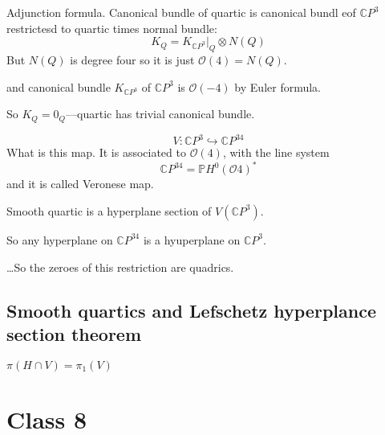 \begin{remark}
	Adjunction formula. Canonical bundle of quartic is canonical bundl eof $\mathbb{C}P^{3}$ restrictesd to quartic times normal bundle:
	\[K_Q=K_{\mathbb{C}P^{3}}|_{Q}\otimes N(Q)\]
	But $N(Q)$ is degree four so it is just $\mathcal{O}(4)=N(Q)$.

	and canonical bundle $K_{\mathbb{C}P^{3}}$ of $\mathbb{C}P^{3}$ is $\mathcal{O}(-4)$ by Euler formula.

	So $K_Q=0_Q$---quartic has trivial canonical bundle.
\end{remark}

\[V:\mathbb{C}P^{3}\hookrightarrow \mathbb{C}P^{34}\]
What is this map. It is associated to $\mathcal{O}(4)$, with the line system
\[\mathbb{C}P^{34}=\mathbb{P}H^{0}(\mathcal{O}4)^*\]
and it is called Veronese map.

\begin{claim}
	Smooth quartic is a hyperplane section of $V(\mathbb{C}P^{3})$.
\end{claim}

So any hyperplane on $\mathbb{C}P^{34}$ is a hyuperplane on $\mathbb{C}P^{3}$.

…So the zeroes of this restriction are quadrics.

\subsection{Smooth quartics and Lefschetz hyperplance section theorem}

\begin{thm}\leavevmode
	$ \pi(H\cap V)=\pi_1(V)$
\end{thm}





\section{Class 8}






